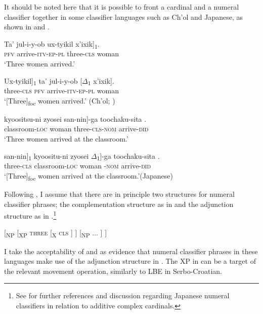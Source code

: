 \documentclass[output=paper]{langscibook}
\begin{document}
It should be noted here that it is possible to front a cardinal and a numeral classifier together in some classifier languages such as Ch'ol and Japanese, as shown in  and . 

\ea
\ea
\gll Ta' jul-i-y-ob \minsp{[} {ux-tyikil} x'ixik]\textsubscript{$1$}.\\  
     \textsc{pfv} arrive-\textsc{itv-ep-pl} {} three-\textsc{cls} woman\\ 
\glt `Three women arrived.'

\ex\label{tat:ex:chol}
\gll \minsp{[} {Ux-tyikil}]\textsubscript{$1$} ta' jul-i-y-ob [$\Delta$\textsubscript{$1$} x'ixik].\\  
     {} three-\textsc{cls} \textsc{pfv} arrive-\textsc{itv-ep-pl} {} woman\\ 
\glt `[Three]\textsubscript{foc} women arrived.' \hfill(Ch'ol; \citealt[19]{Baleetal2019})
\z\z

\ea
\ea
\gll kyoositsu-ni \minsp{[} zyosei {san-nin}]-ga toochaku-sita .\\  
     classroom-\textsc{loc} {} woman three-\textsc{cls}-\textsc{nom} arrive-\textsc{did} \\ 
\glt `Three women arrived at the classroom.'

\ex\label{tat:ex:japa}
\gll \minsp{[} {san-nin}]\textsubscript{$1$} kyoositu-ni \minsp{[} zyosei $\Delta$\textsubscript{$1$}]-ga toochaku-sita .\\  
     {} three-\textsc{cls} classroom-\textsc{loc} {} woman {}\hspace*{5mm}-\textsc{nom} arrive-\textsc{did}\\ 
\glt `[Three]\textsubscript{foc} women arrived at the classroom.'\hfill(Japanese)
\z\z

\noindent Following \citet{HuangOchi2014}, I assume that there are in principle two structures for numeral classifier phrases; the complementation structure as in  and the adjunction structure as in .\footnote{See  for further references and discussion regarding Japanese numeral classifiers in relation to additive complex cardinals.}

\ea\label{tat:ho2}
[\textsubscript{NP} [\textsubscript{XP} \textsc{three} [\textsubscript{X} \textsc{cls} ] ] [\textsubscript{NP} ... ] ]
\z

\noindent I take the acceptability of  and  as evidence that numeral classifier phrases in these languages make use of the adjunction structure in . The XP in  can be a target of the relevant movement operation, similarly to LBE in Serbo-Croatian.
\end{document}

